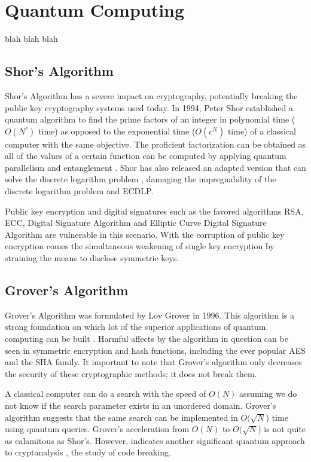 \section{Quantum Computing}
blah blah blah

\subsection{Shor's Algorithm}
Shor's Algorithm has a severe impact on cryptography, potentially breaking the public key cryptography systems used today.
In 1994, Peter Shor established a quantum algorithm to find the prime factors of an integer in polynomial time (\(O(N^c)\) time) as opposed to the exponential time (\(O(c^N)\) time) of a classical computer with the same objective. 
The proficient factorization can be obtained as all of the values of a certain function can be computed by applying quantum parallelism and entanglement \cite{Impact_QC_Cryptog_1}. 
Shor has also released an adapted version that can solve the discrete logarithm problem \cite{Post_Q_Cryptog}, damaging the impregnability of the discrete logarithm problem and ECDLP. 

Public key encryption and digital signatures such as the favored algorithms RSA, ECC, Digital Signature Algorithm and Elliptic Curve Digital Signature Algorithm are vulnerable in this scenario. With the corruption of public key encryption comes the simultaneous weakening of single key encryption by straining the means to disclose symmetric keys.

\subsection{Grover's Algorithm}
Grover's Algorithm was formulated by Lov Grover in 1996. This algorithm is a strong foundation on which lot of the superior applications of quantum computing can be built \cite{Post_Q_Cryptog}. Harmful affects by the algorithm in question can be seen in symmetric encryption and hash functions, including the ever popular AES and the SHA family. It important to note that Grover's algorithm only decreases the security of these cryptographic methods; it does not break them.

A classical computer can do a search with the speed of \(O(N)\) assuming we do not know if the search parameter exists in an unordered domain. Grover's algorithm suggests that the same search can be implemented in \(O(\sqrt{N}\)) time using quantum queries. Grover's acceleration from \(O(N)\) to \(O(\sqrt{N}\)) is not quite as calamitous as Shor's. However, indicates another significant quantum approach to cryptanalysis \cite{Quantum_Cryptanal}, the study of code breaking. 

